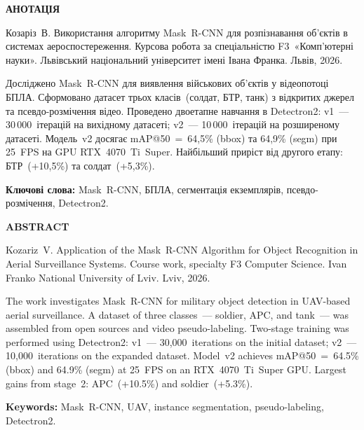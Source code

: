 \documentclass[14pt,a4paper]{extreport}
\begin{document}
\thispagestyle{empty}
\begin{center}\bfseries АНОТАЦІЯ\end{center}

\noindent Козаріз~В. Використання алгоритму Mask~R-CNN для розпізнавання
об'єктів в системах аероспостереження. Курсова робота за спеціальністю
F3~«Комп'ютерні науки». Львівський національний
університет імені Івана Франка. Львів, 2026.

Досліджено Mask~R-CNN для виявлення військових об'єктів у відеопотоці
БПЛА. Сформовано датасет трьох класів~(солдат, БТР, танк) з відкритих
джерел та псевдо-розмічення відео. Проведено двоетапне навчання в
Detectron2: v1~--- 30\,000~ітерацій на вихідному датасеті;
v2~--- 10\,000~ітерацій на розширеному датасеті. Модель~v2 досягає
mAP@50~=~64,5\% (bbox) та 64,9\% (segm) при 25~FPS на GPU
RTX~4070~Ti~Super. Найбільший приріст від другого етапу:
БТР~(+10,5\%) та солдат~(+5,3\%).

\textbf{Ключові слова:} Mask~R-CNN, БПЛА, сегментація екземплярів,
псевдо-розмічення, Detectron2.

\vspace{6mm}
\begin{center}\bfseries ABSTRACT\end{center}

\noindent Kozariz~V. Application of the Mask~R-CNN Algorithm for Object
Recognition in Aerial Surveillance Systems. Course work, specialty F3
Computer Science. Ivan Franko National University of Lviv.
Lviv, 2026.

The work investigates Mask~R-CNN for military object detection in
UAV-based aerial surveillance. A dataset of three classes~--- soldier,
APC, and tank~--- was assembled from open sources and video
pseudo-labeling. Two-stage training was performed using Detectron2:
v1~--- 30,000~iterations on the initial dataset;
v2~--- 10,000~iterations on the expanded dataset. Model~v2 achieves
mAP@50~=~64.5\% (bbox) and 64.9\% (segm) at 25~FPS on an
RTX~4070~Ti~Super GPU. Largest gains from stage~2:
APC~(+10.5\%) and soldier~(+5.3\%).

\textbf{Keywords:} Mask~R-CNN, UAV, instance segmentation,
pseudo-labeling, Detectron2.

\clearpage

\thispagestyle{empty}
\renewcommand{\contentsname}{\centerline{ЗМІСТ}}
\begin{singlespace}
\tableofcontents
\end{singlespace}
\clearpage
\end{document}
